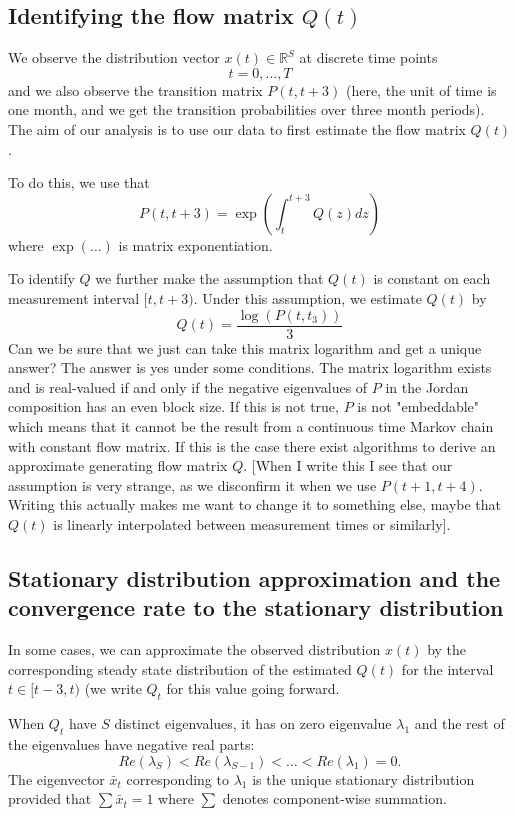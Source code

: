 \subsection{Identifying the flow matrix $Q(t)$}
We observe the distribution vector $x(t) \in \mathbb{R}^S$ at discrete time points
\[
t = 0,\dots, T
\]
and we also observe the transition matrix $P(t,t+3)$ (here, the unit of time is one month, and we get the transition probabilities over three month periods). The aim of our analysis is to use our data to first estimate the flow matrix $Q(t)$. 

To do this, we use that
\[
P(t,t+3) = \exp\left(\int_{t}^{t+3} Q(z)dz\right)
\]
where $\exp\left(\dots\right)$ is matrix exponentiation. 

To identify $Q$ we further make the assumption that $Q(t)$ is constant on each measurement interval $[t,t+3)$. Under this assumption, we estimate $Q(t)$ by
\[
Q(t)=\frac{\log(P(t,t_3))}{3}
\]
Can we be sure that we just can take this matrix logarithm and get a unique answer? The answer is yes under some conditions. The matrix logarithm exists and is real-valued if and only if the negative eigenvalues of $P$ in the Jordan composition has an even block size. If this is not true, $P$ is not "embeddable" which means that it cannot be the result from a continuous time Markov chain with constant flow matrix. If this is the case there exist algorithms to derive an approximate generating flow matrix $Q$.
[When I write this I see that our assumption is very strange, as we disconfirm it when we use $P(t+1,t+4)$. Writing this actually makes me want to change it to something else, maybe that $Q(t)$ is linearly interpolated between measurement times or similarly].

\subsection{Stationary distribution approximation and the convergence rate to the stationary distribution}
In some cases, we can approximate the observed distribution $x(t)$ by the corresponding steady state distribution of the estimated $Q(t)$ for the interval $t\in[t-3,t)$ (we write $Q_t$ for this value going forward.

When $Q_t$ have $S$ distinct eigenvalues, it has on zero eigenvalue $\lambda_1$ and the rest of the eigenvalues have negative real parts:
\[
Re(\lambda_S)<Re(\lambda_{S-1})<\dots < Re(\lambda_1)=0.
\]
The eigenvector $\bar x_t$ corresponding to $\lambda_1$ is the unique stationary distribution provided that $\sum \bar x_t=1$ where $\sum$ denotes component-wise summation.

